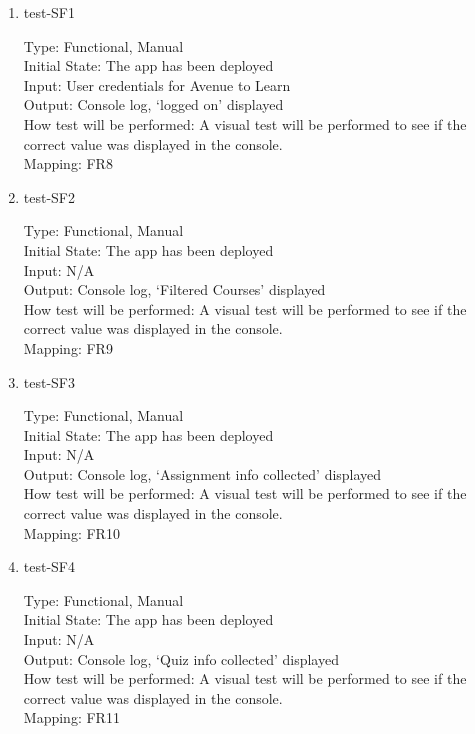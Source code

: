 \documentclass[12pt, titlepage]{article}
\begin{document}
\begin{enumerate}
\item{test-SF1\\}

Type: Functional, Manual\\
Initial State: The app has been deployed\\
Input: User credentials for Avenue to Learn\\
Output: Console log, ‘logged on’ displayed\\
How test will be performed: A visual test will be performed to see if the correct value was displayed in the console.\\
Mapping: FR8


\item{test-SF2\\}

Type: Functional, Manual\\
Initial State: The app has been deployed\\
Input: N/A\\
Output: Console log, ‘Filtered Courses’ displayed\\
How test will be performed: A visual test will be performed to see if the correct value was displayed in the console.\\
Mapping: FR9


\item{test-SF3\\}

Type: Functional, Manual\\
Initial State: The app has been deployed\\
Input: N/A\\
Output: Console log, ‘Assignment info collected’ displayed\\
How test will be performed: A visual test will be performed to see if the correct value was displayed in the console.\\
Mapping: FR10


\item{test-SF4\\}

Type: Functional, Manual\\
Initial State: The app has been deployed\\
Input: N/A\\
Output: Console log, ‘Quiz info collected’ displayed\\
How test will be performed: A visual test will be performed to see if the correct value was displayed in the console.\\
Mapping: FR11



\end{enumerate}
\end{document}
